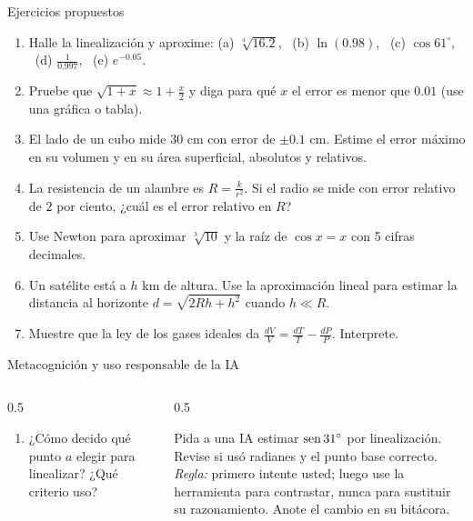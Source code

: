\documentclass[10pt,aspectratio=169]{beamer}
\begin{document}
\begin{frame}{Ejercicios propuestos}
  \small
  \begin{ejercicio}
    \begin{enumerate}
      \item Halle la linealización y aproxime: (a) $\sqrt[4]{16.2}$, \ (b) $\ln(0.98)$, \ (c) $\cos 61^\circ$, \ (d) $\frac{1}{0.997}$, \ (e) $e^{-0.05}$.
      \item Pruebe que $\sqrt{1+x}\approx1+\frac x2$ y diga para qué $x$ el error es menor que $0.01$ (use una gráfica o tabla).
      \item El lado de un cubo mide $30$ cm con error de $\pm0.1$ cm. Estime el error máximo en su volumen y en su área superficial, absolutos y relativos.
      \item La resistencia de un alambre es $R=\frac{k}{r^2}$. Si el radio se mide con error relativo de $2$ por ciento, ¿cuál es el error relativo en $R$?
      \item Use Newton para aproximar $\sqrt[3]{10}$ y la raíz de $\cos x=x$ con 5 cifras decimales.
      \item Un satélite está a $h$ km de altura. Use la aproximación lineal para estimar la distancia al horizonte $d=\sqrt{2Rh+h^2}$ cuando $h\ll R$.
      \item Muestre que la ley de los gases ideales da $\frac{dV}{V}=\frac{dT}{T}-\frac{dP}{P}$. Interprete.
    \end{enumerate}
  \end{ejercicio}
\end{frame}

\begin{frame}{Metacognición y uso responsable de la IA}
  \small
  \begin{columns}[t]
    \begin{column}{0.5\textwidth}
      \begin{metacog}
        \begin{enumerate}
          \metacomun
          \item ¿Cómo decido qué punto $a$ elegir para linealizar? ¿Qué criterio uso?
        \end{enumerate}
      \end{metacog}
    \end{column}
    \begin{column}{0.5\textwidth}
      \begin{iabox}
        Pida a una IA estimar $\operatorname{sen} 31^\circ$ por linealización. Revise si usó radianes y el punto base correcto.\\[2pt]
        \textit{Regla:} primero intente usted; luego use la herramienta para contrastar, nunca para sustituir su razonamiento. Anote el cambio en su bitácora.
      \end{iabox}
    \end{column}
  \end{columns}
\end{frame}
\end{document}
